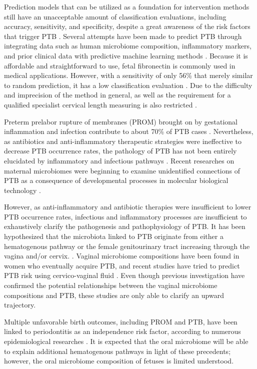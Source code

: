 \documentclass[11pt, a4paper, onecolumn, oneside]{report}
\begin{document}
            Prediction models that can be utilized as a foundation for intervention methods still have an unacceptable amount of classification evaluations, including accuracy, sensitivity, and specificity, despite a great awareness of the risk factors that trigger PTB \cite{PTB-prediction-1}. Several attempts have been made to predict PTB through integrating data such as human microbiome composition, inflammatory markers, and prior clinical data with predictive machine learning methods \cite{PTB-prediction-2}. Because it is affordable and straightforward to use, fetal fibronectin is commonly used in medical applications. However, with a sensitivity of only 56\% that merely similar to random prediction, it has a low classification evaluation \cite{PTB-prediction-3}. Due to the difficulty and imprecision of the method in general, as well as the requirement for a qualified specialist cervical length measuring is also restricted \cite{PTB-prediction-4}.

            Preterm prelabor rupture of membranes (PROM) brought on by gestational inflammation and infection contribute to about 70\% of PTB cases \cite{PTB-prediction-5}. Nevertheless, as antibiotics and anti-inflammatory therapeutic strategies were ineffective to decrease PTB occurrence rates, the pathology of PTB has not been entirely elucidated by inflammatory and infectious pathways \cite{PTB-mechanism-1}. Recent researches on maternal microbiomes were beginning to examine unidentified connections of PTB as a consequence of developmental processes in molecular biological technology \cite{PTB-mechanism-2}.

            However, as anti-inflammatory and antibiotic therapies were insufficient to lower PTB occurrence rates, infectious and inflammatory processes are insufficient to exhaustively clarify the pathogenesis and pathophysiology of PTB. It has been hypothesized that the microbiota linked to PTB originate from either a hematogenous pathway or the female genitourinary tract increasing through the vagina and/or cervix. \cite{PTB-mechanism-3}. Vaginal microbiome compositions have been found in women who eventually acquire PTB, and recent studies have tried to predict PTB risk using cervico-vaginal fluid \cite{PTB-mechanism-4}. Even though previous investigation have confirmed the potential relationships between the vaginal microbiome compositions and PTB, these studies are only able to clarify an upward trajectory.

            Multiple unfavorable birth outcomes, including PROM and PTB, have been linked to periodontitis as an independence risk factor, according to numerous epidemiological researches \cite{PTB-mechanism-5}. It is expected that the oral microbiome will be able to explain additional hematogenous pathways in light of these precedents; however, the oral microbiome composition of fetuses is limited understood.
\end{document}
